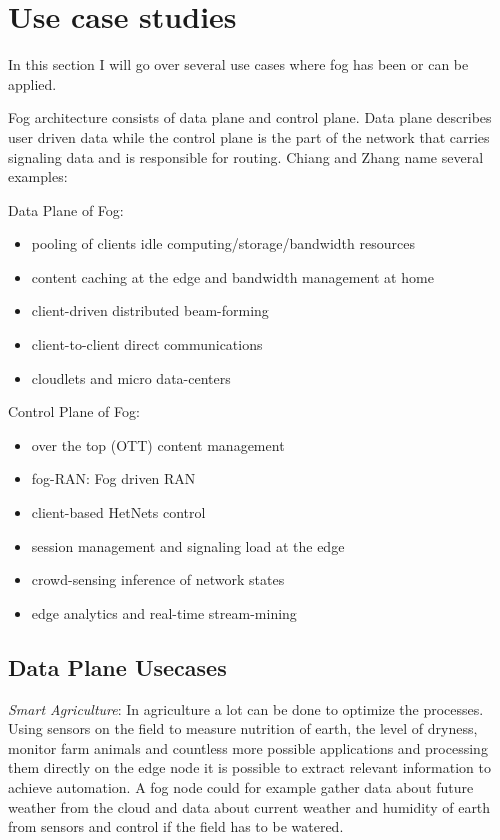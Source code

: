 \section{Use case studies}

In this section I will go over several use cases where fog has been or can be applied.

Fog architecture consists of data plane and control plane\cite[p. 860]{DBLP:journals/iotj/ChiangZ16}. Data plane describes user driven data while the control plane is the part of the network that carries signaling data and is responsible for routing. Chiang and Zhang name several examples:\cite[p. 860]{DBLP:journals/iotj/ChiangZ16}

Data Plane of Fog:
\begin{itemize}
	\item  pooling of clients idle computing/storage/bandwidth resources
	\item content caching at the edge and bandwidth management at home
	\item client-driven distributed beam-forming
	\item client-to-client direct communications
	\item cloudlets and micro data-centers
\end{itemize}

Control Plane of Fog:
\begin{itemize}
	\item over the top (OTT) content management
	\item fog-RAN: Fog driven RAN
	\item client-based HetNets control
	\item session management and signaling load at the edge
	\item crowd-sensing inference of network states
	\item edge analytics and real-time stream-mining
\end{itemize}

\subsection{Data Plane Usecases}

\textit{Smart Agriculture}: In agriculture a lot can be done to optimize the processes. Using sensors on the field to measure nutrition of earth, the level of dryness, monitor farm animals and countless more possible applications and processing them directly on the edge node it is possible to extract relevant information to achieve automation. A fog node could for example gather data about future weather from the cloud and data about current weather and humidity of earth from sensors and control if the field has to be watered. 

